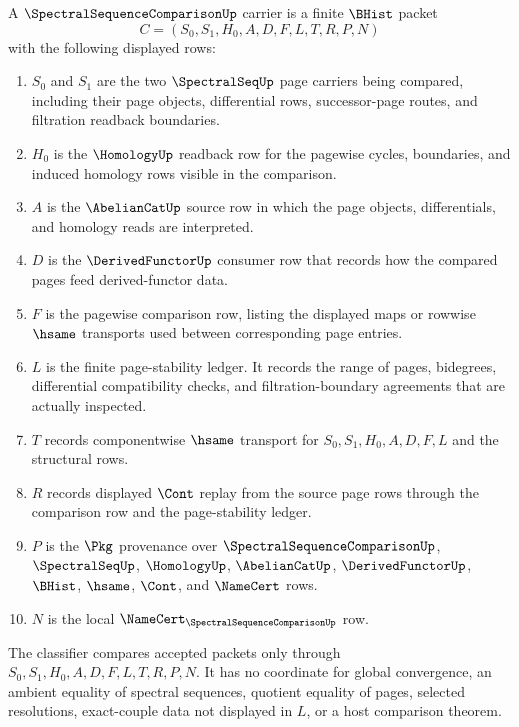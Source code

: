 \begin{definition}
\label{def:spectral-sequence-comparison-carrier}
A $\SpectralSequenceComparisonUp$ carrier is a finite $\BHist$ packet
$$
C=(S_0,S_1,H_0,A,D,F,L,T,R,P,N)
$$
with the following displayed rows:
\begin{enumerate}
\item $S_0$ and $S_1$ are the two $\SpectralSeqUp$ page carriers being compared, including their page objects, differential rows, successor-page routes, and filtration readback boundaries.
\item $H_0$ is the $\HomologyUp$ readback row for the pagewise cycles, boundaries, and induced homology rows visible in the comparison.
\item $A$ is the $\AbelianCatUp$ source row in which the page objects, differentials, and homology reads are interpreted.
\item $D$ is the $\DerivedFunctorUp$ consumer row that records how the compared pages feed derived-functor data.
\item $F$ is the pagewise comparison row, listing the displayed maps or rowwise $\hsame$ transports used between corresponding page entries.
\item $L$ is the finite page-stability ledger. It records the range of pages, bidegrees, differential compatibility checks, and filtration-boundary agreements that are actually inspected.
\item $T$ records componentwise $\hsame$ transport for $S_0,S_1,H_0,A,D,F,L$ and the structural rows.
\item $R$ records displayed $\Cont$ replay from the source page rows through the comparison row and the page-stability ledger.
\item $P$ is the $\Pkg$ provenance over $\SpectralSequenceComparisonUp$, $\SpectralSeqUp$, $\HomologyUp$, $\AbelianCatUp$, $\DerivedFunctorUp$, $\BHist$, $\hsame$, $\Cont$, and $\NameCert$ rows.
\item $N$ is the local $\NameCert_{\SpectralSequenceComparisonUp}$ row.
\end{enumerate}
The classifier compares accepted packets only through $S_0,S_1,H_0,A,D,F,L,T,R,P,N$. It has no coordinate for global convergence, an ambient equality of spectral sequences, quotient equality of pages, selected resolutions, exact-couple data not displayed in $L$, or a host comparison theorem.
\end{definition}

